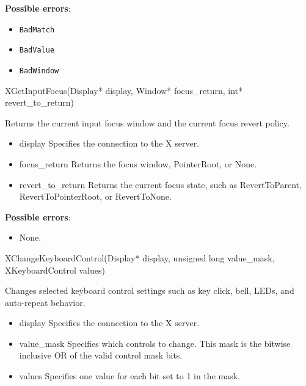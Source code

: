 \documentclass{report}
\begin{document}
\begin{itemize}
        \textbf{Possible errors}:
        \begin{itemize}
            \item \texttt{BadMatch}
            \item \texttt{BadValue}
            \item \texttt{BadWindow}
        \end{itemize}

        \begin{cppcode}
        XGetInputFocus(Display* display, Window* focus_return, int* revert_to_return)
        \end{cppcode}
        \bigbreak \noindent
        Returns the current input focus window and the current focus revert policy.

        \begin{itemize}
            \item display Specifies the connection to the X server.
            \item focus\_return Returns the focus window, PointerRoot, or None.
            \item revert\_to\_return Returns the current focus state, such as RevertToParent, RevertToPointerRoot, or RevertToNone.
        \end{itemize}

        \textbf{Possible errors}:
        \begin{itemize}
            \item None.
        \end{itemize}

        \begin{cppcode}
        XChangeKeyboardControl(Display* display, unsigned long value_mask, XKeyboardControl values)
        \end{cppcode}
        \bigbreak \noindent
        Changes selected keyboard control settings such as key click, bell, LEDs, and auto-repeat behavior.

        \begin{itemize}
            \item display Specifies the connection to the X server.
            \item value\_mask Specifies which controls to change. This mask is the bitwise inclusive OR of the valid control mask bits.
            \item values Specifies one value for each bit set to 1 in the mask.
        \end{itemize}


\end{itemize}
\end{document}

